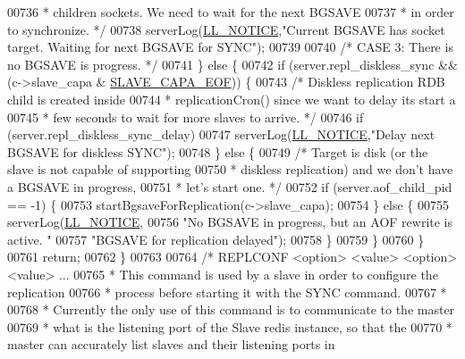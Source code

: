\begin{DoxyCode}
{{{{{{{{{{{{{{{{{{{{{{{{{{{{{{00736 \textcolor{comment}{         * children sockets. We need to wait for the next BGSAVE}
00737 \textcolor{comment}{         * in order to synchronize. */}
00738         serverLog(\hyperlink{server_8h_a8c54c191e436c7dd3012167212692401}{LL\_NOTICE},\textcolor{stringliteral}{"Current BGSAVE has socket target. Waiting for next BGSAVE for
       SYNC"});
00739 
00740     \textcolor{comment}{/* CASE 3: There is no BGSAVE is progress. */}
00741     \} \textcolor{keywordflow}{else} \{
00742         \textcolor{keywordflow}{if} (server.repl\_diskless\_sync && (c->slave\_capa & \hyperlink{server_8h_a679170caf08eeb16170fc653c9c1dfb2}{SLAVE\_CAPA\_EOF})) \{
00743             \textcolor{comment}{/* Diskless replication RDB child is created inside}
00744 \textcolor{comment}{             * replicationCron() since we want to delay its start a}
00745 \textcolor{comment}{             * few seconds to wait for more slaves to arrive. */}
00746             \textcolor{keywordflow}{if} (server.repl\_diskless\_sync\_delay)
00747                 serverLog(\hyperlink{server_8h_a8c54c191e436c7dd3012167212692401}{LL\_NOTICE},\textcolor{stringliteral}{"Delay next BGSAVE for diskless SYNC"});
00748         \} \textcolor{keywordflow}{else} \{
00749             \textcolor{comment}{/* Target is disk (or the slave is not capable of supporting}
00750 \textcolor{comment}{             * diskless replication) and we don't have a BGSAVE in progress,}
00751 \textcolor{comment}{             * let's start one. */}
00752             \textcolor{keywordflow}{if} (server.aof\_child\_pid == -1) \{
00753                 startBgsaveForReplication(c->slave\_capa);
00754             \} \textcolor{keywordflow}{else} \{
00755                 serverLog(\hyperlink{server_8h_a8c54c191e436c7dd3012167212692401}{LL\_NOTICE},
00756                     \textcolor{stringliteral}{"No BGSAVE in progress, but an AOF rewrite is active. "}
00757                     \textcolor{stringliteral}{"BGSAVE for replication delayed"});
00758             \}
00759         \}
00760     \}
00761     \textcolor{keywordflow}{return};
00762 \}
00763 
00764 \textcolor{comment}{/* REPLCONF <option> <value> <option> <value> ...}
00765 \textcolor{comment}{ * This command is used by a slave in order to configure the replication}
00766 \textcolor{comment}{ * process before starting it with the SYNC command.}
00767 \textcolor{comment}{ *}
00768 \textcolor{comment}{ * Currently the only use of this command is to communicate to the master}
00769 \textcolor{comment}{ * what is the listening port of the Slave redis instance, so that the}
00770 \textcolor{comment}{ * master can accurately list slaves and their listening ports in}
}}}}}}}}}}}}}}}}}}}}}}}}}}}}}}
\end{DoxyCode}
